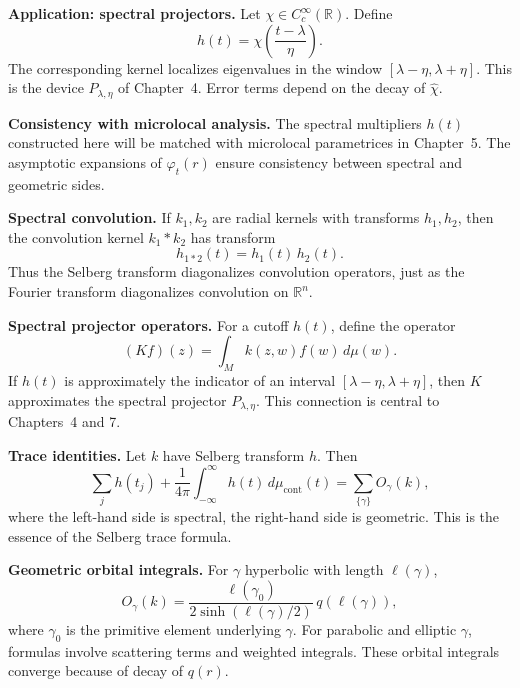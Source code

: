 \medskip

\noindent\textbf{Application: spectral projectors.}
Let $\chi\in C^{\infty}_{c}(\mathbb{R})$.
Define
\[
  h(t) = \chi\!\left(\frac{t-\lambda}{\eta}\right).
\]
The corresponding kernel localizes eigenvalues in the window $[\lambda-\eta,\lambda+\eta]$.
This is the device $P_{\lambda,\eta}$ of Chapter~4.
Error terms depend on the decay of $\widehat{\chi}$.

\medskip

\noindent\textbf{Consistency with microlocal analysis.}
The spectral multipliers $h(t)$ constructed here
will be matched with microlocal parametrices in Chapter~5.
The asymptotic expansions of $\varphi_{t}(r)$ ensure consistency
between spectral and geometric sides.

\medskip

\noindent


\noindent\textbf{Spectral convolution.}
If $k_{1},k_{2}$ are radial kernels with transforms $h_{1},h_{2}$,
then the convolution kernel $k_{1}\ast k_{2}$ has transform
\[
  h_{1\ast 2}(t) = h_{1}(t)\,h_{2}(t).
\]
Thus the Selberg transform diagonalizes convolution operators,
just as the Fourier transform diagonalizes convolution on $\mathbb{R}^{n}$.

\medskip

\noindent\textbf{Spectral projector operators.}
For a cutoff $h(t)$,
define the operator
\[
  (Kf)(z) = \int_{M} k(z,w)f(w)\,d\mu(w).
\]
If $h(t)$ is approximately the indicator of an interval $[\lambda-\eta,\lambda+\eta]$,
then $K$ approximates the spectral projector $P_{\lambda,\eta}$.
This connection is central to Chapters~4 and 7.

\medskip

\noindent\textbf{Trace identities.}
Let $k$ have Selberg transform $h$.
Then
\[
  \sum_{j} h(t_{j}) + \frac{1}{4\pi}\int_{-\infty}^{\infty} h(t)\,d\mu_{\mathrm{cont}}(t)
  = \sum_{\{\gamma\}} O_{\gamma}(k),
\]
where the left-hand side is spectral,
the right-hand side is geometric.
This is the essence of the Selberg trace formula.

\medskip

\noindent\textbf{Geometric orbital integrals.}
For $\gamma$ hyperbolic with length $\ell(\gamma)$,
\[
  O_{\gamma}(k) = \frac{\ell(\gamma_{0})}{2\sinh(\ell(\gamma)/2)}
  \,q(\ell(\gamma)),
\]
where $\gamma_{0}$ is the primitive element underlying $\gamma$.
For parabolic and elliptic $\gamma$, formulas involve scattering terms and weighted integrals.
These orbital integrals converge because of decay of $q(r)$.

